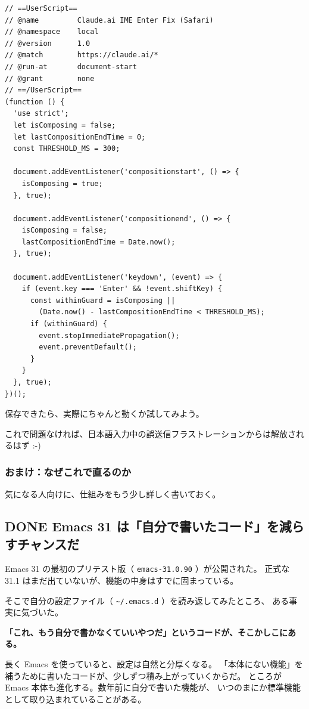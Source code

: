 \documentclass[11pt]{article}
\begin{document}
\begin{verbatim}
// ==UserScript==
// @name         Claude.ai IME Enter Fix (Safari)
// @namespace    local
// @version      1.0
// @match        https://claude.ai/*
// @run-at       document-start
// @grant        none
// ==/UserScript==
(function () {
  'use strict';
  let isComposing = false;
  let lastCompositionEndTime = 0;
  const THRESHOLD_MS = 300;

  document.addEventListener('compositionstart', () => {
    isComposing = true;
  }, true);

  document.addEventListener('compositionend', () => {
    isComposing = false;
    lastCompositionEndTime = Date.now();
  }, true);

  document.addEventListener('keydown', (event) => {
    if (event.key === 'Enter' && !event.shiftKey) {
      const withinGuard = isComposing ||
        (Date.now() - lastCompositionEndTime < THRESHOLD_MS);
      if (withinGuard) {
        event.stopImmediatePropagation();
        event.preventDefault();
      }
    }
  }, true);
})();
\end{verbatim}

保存できたら、実際にちゃんと動くか試してみよう。

これで問題なければ、日本語入力中の誤送信フラストレーションからは解放されるはず :-)
\subsubsection{おまけ：なぜこれで直るのか}
\label{sec:orgba31b98}

気になる人向けに、仕組みをもう少し詳しく書いておく。
\subsection{{\bfseries\sffamily DONE} Emacs 31 は「自分で書いたコード」を減らすチャンスだ}
\label{sec:orgf1e4894}
Emacs 31 の最初のプリテスト版（ \texttt{emacs-31.0.90} ）が公開された。
正式な 31.1 はまだ出ていないが、機能の中身はすでに固まっている。

そこで自分の設定ファイル（ \texttt{\textasciitilde{}/.emacs.d} ）を読み返してみたところ、
ある事実に気づいた。

\textbf{「これ、もう自分で書かなくていいやつだ」というコードが、そこかしこにある。}

長く Emacs を使っていると、設定は自然と分厚くなる。
「本体にない機能」を補うために書いたコードが、少しずつ積み上がっていくからだ。
ところが Emacs 本体も進化する。数年前に自分で書いた機能が、
いつのまにか標準機能として取り込まれていることがある。
\end{document}

